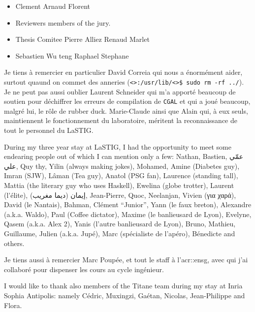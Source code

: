\begin{itemize}
    \item Clement Arnaud Florent
    \item Reviewers members of the jury.
    \item Thesis Comitee Pierre Alliez Renaud Marlet
    \item Sebastien Wu teng Raphael Stephane
\end{itemize}

Je tiens à remercier en particulier David Correia qui nous a énormément aider, surtout quaund on commet des anneries (\verb!<>:/usr/lib/<>$ sudo rm -rf ../!).
Je ne peut pas aussi oublier Laurent Schneider qui m'a apporté beaucoup de soutien pour déchiffrer les erreurs de compilation de \verb!CGAL! et qui a joué beaucoup, malgré lui, le rôle de rubber duck.
Marie-Claude ainsi que Alain qui, à eux seuls, maintiennent le fonctionnement du laboratoire, méritent la reconnaissance de tout le personnel du LaSTIG.

During my three year stay at LaSTIG, I had the opportunity to meet some endearing people out of which I can mention only a few: Nathan, Bastien, \foreignlanguage{arabic}{عمّي علي}, Quy thy, Yilin (always making jokes), Mohamed, Amine (Diabetes guy), Imran (SJW), Lâman (Tea guy), Anatol (PSG fan), Laurence (standing tall), Mattia (the literary guy who uses Haskell), Ewelina (globe trotter), Laurent (l'élite), \foreignlanguage{arabic}{إيمان (ديما مغريب)}, Jean-Pierre, Quoc, Neelanjan, Vivien (\foreignlanguage{greek}{για χαρά}), David (le Nantais), Bahman, Clément ``Junior'', Yann (le faux breton), Alexandre (a.k.a. Waldo), Paul (Coffee dictator), Maxime (le banlieusard de Lyon), Evelyne, Qasem (a.k.a. Alex 2), Yanis (l'autre banlieusard de Lyon), Bruno, Mathieu, Guillaume, Julien (a.k.a. Jupé), Marc (spécialiste de l'apéro), Bénedicte and others.

Je tiens aussi à remercier Marc Poupée, et tout le staff à l'\acrshort*{acr::ensg}, avec qui j'ai collaboré pour dispenser les cours au cycle ingénieur.

I would like to thank also members of the Titane team during my stay at Inria Sophia Antipolis: namely Cédric, Muxingzi, Gaétan, Nicolas, Jean-Philippe and Flora.


